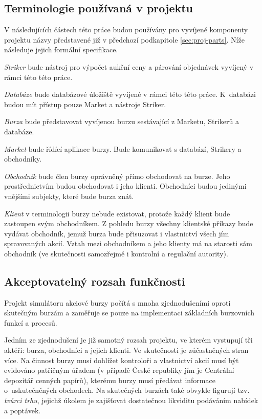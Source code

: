 \documentclass[thesis=M,czech]{FITthesis}[2012/06/26]
\begin{document}

\subsection{Terminologie používaná v projektu}

V následujících částech této práce budou používány pro vyvíjené komponenty projektu názvy představené již v předchozí podkapitole 
\ref{sec:proj-parts}. Níže následuje jejich formální specifikace.

\textit{Striker} bude nástroj pro výpočet aukční ceny a párování objednávek vyvíjený v rámci této této práce. 

\textit{Databáze} bude databázové úložiště vyvíjené v rámci této této práce. K~databázi budou mít přístup pouze Market a nástroje Striker.

\textit{Burza} bude představovat vyvíjenou burzu sestávající z Marketu, Strikerů a databáze. 

\textit{Market} bude řídící aplikace burzy. Bude komunikovat s databází, Strikery a obchodníky.

\textit{Obchodník} bude člen burzy oprávněný přímo obchodovat na burze. Jeho prostřednictvím budou obchodovat i jeho klienti. 
Obchodníci budou jedinými vnějšími subjekty, které bude burza znát.

\textit{Klient} v terminologii burzy nebude existovat, protože každý klient bude zastoupen svým obchodníkem. Z pohledu burzy 
všechny klientské příkazy bude vydávat obchodník, jemuž burza bude přisuzovat i vlastnictví všech jím spravovaných akcií. Vztah 
mezi obchodníkem a jeho klienty má na starosti sám obchodník (ve skutečnosti samozřejmě i kontrolní a regulační autority).



\subsection{Akceptovatelný rozsah funkčnosti} 

Projekt simulátoru akciové burzy počítá s mnoha zjednodušeními oproti skutečným burzám a zaměřuje se pouze na implementaci 
základních burzovních funkcí a procesů. 

Jedním ze zjednodušení je již samotný rozsah projektu, ve kterém vystupují tři aktéři: burza, obchodníci a jejich klienti. Ve skutečnosti 
je zúčastněných stran více. Na činnost burzy musí dohlížet kontroloři a vlastnictví akcií musí být evidováno patřičným úřadem 
(v případě České republiky jím je Centrální depozitář cenných papírů), kterému burzy musí předávat informace o~uskutečněných 
obchodech. Na skutečných burzách také obvykle figurují tzv. \textit{tvůrci trhu}, jejichž úkolem je zajišťovat dostatečnou 
likviditu podáváním nabídek a poptávek. 
\end{document}
